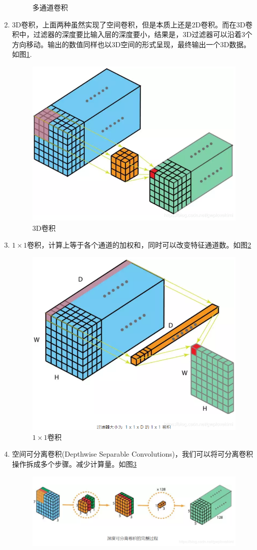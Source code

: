 \begin{enumerate}
\begin{figure}[H]
		\caption{多通道卷积}
	\end{figure}
	\item 3D卷积，上面两种虽然实现了空间卷积，但是本质上还是2D卷积。而在3D卷积中，过滤器的深度要比输入层的深度要小，结果是，3D过滤器可以沿着3个方向移动。输出的数值同样也以3D空间的形式呈现，最终输出一个3D数据。如图\ref{3d_conv}.
	\begin{figure}[H]
		\centering
		\label{3d_conv}
		\includegraphics[width=0.3\linewidth]{./img/code/CNN/5}
		\caption{3D卷积}
	\end{figure}
	\item $1\times 1$卷积，计算上等于各个通道的加权和，同时可以改变特征通道数。如图\ref{1_conv}
	\begin{figure}[H]
		\label{1_conv}
		\centering
		\includegraphics[width=0.3\linewidth]{./img/code/CNN/6}
		\caption{$1\times 1$卷积}
	\end{figure}
	\item 空间可分离卷积(Depthwise Separable Convolutions)，我们可以将可分离卷积操作拆成多个步骤。减少计算量。如图\ref{space_sep_conv}
	\begin{figure}[H]
		\label{space_sep_conv}
		\centering
		\includegraphics[width=0.5\linewidth]{./img/code/CNN/8}

\end{figure}
\end{enumerate}
